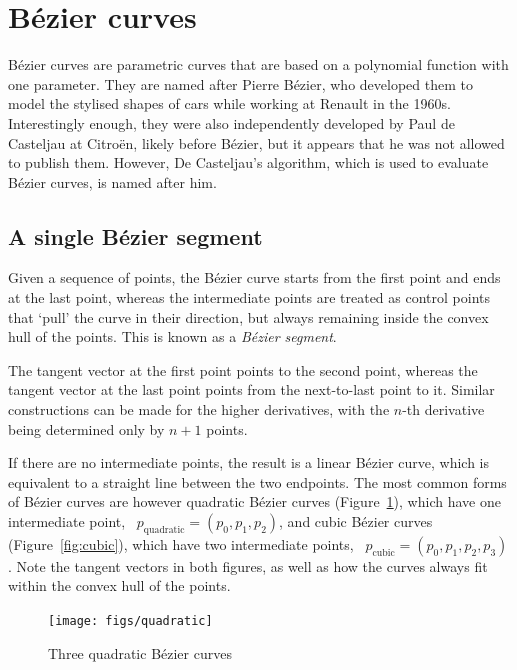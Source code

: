 \section{B\'ezier curves}

B\'ezier curves are parametric curves that are based on a polynomial function with one parameter.
They are named after Pierre B\'ezier, who developed them to model the stylised shapes of cars while working at Renault in the 1960s.
Interestingly enough, they were also independently developed by Paul de Casteljau at Citro\"en, likely before B\'ezier, but it appears that he was not allowed to publish them.
However, De Casteljau's algorithm, which is used to evaluate B\'ezier curves, is named after him.

\subsection{A single B\'ezier segment}

Given a sequence of points, the B\'ezier curve starts from the first point and ends at the last point, whereas the intermediate points are treated as control points that `pull' the curve in their direction, but always remaining inside the convex hull of the points.
This is known as a \emph{B\'ezier segment}.

The tangent vector at the first point points to the second point, whereas the tangent vector at the last point points from the next-to-last point to it.
Similar constructions can be made for the higher derivatives, with the \(n\)-th derivative being determined only by \(n+1\) points.

If there are no intermediate points, the result is a linear B\'ezier curve, which is equivalent to a straight line between the two endpoints.
The most common forms of B\'ezier curves are however quadratic B\'ezier curves (Figure~\ref{fig:quadratic}), which have one intermediate point, \eg\ \(p_{\mathrm{quadratic}} = (p_0, p_1, p_2)\), and cubic B\'ezier curves (Figure~\ref{fig:cubic}), which have two intermediate points, \eg\ \(p_{\mathrm{cubic}} = (p_0, p_1, p_2, p_3)\).
Note the tangent vectors in both figures, as well as how the curves always fit within the convex hull of the points.

\begin{figure}
\centering
\texttt{[image: figs/quadratic]}
\caption{Three quadratic B\'ezier curves}%
\label{fig:quadratic}
\end{figure}

